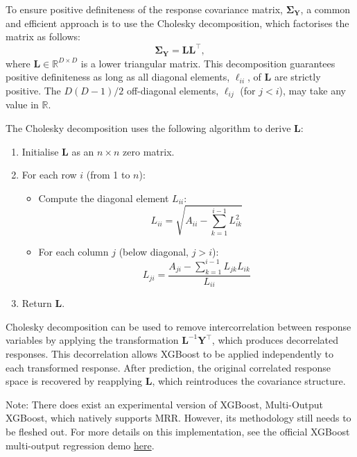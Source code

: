 \documentclass[11pt]{report} %
\begin{document}
To ensure positive definiteness of the response covariance matrix, \( \boldsymbol{\Sigma}_{\mathbf{Y}} \), a common and efficient approach is to use the Cholesky decomposition, which factorises the matrix as follows:
\[
\boldsymbol{\Sigma}_{\mathbf{Y}} = \mathbf{L} \mathbf{L}^\top,
\]
where \( \mathbf{L} \in \mathbb{R}^{D \times D} \) is a lower triangular matrix.\cite{marz2022multi} This decomposition guarantees positive definiteness as long as all diagonal elements, \( \ell_{ii} \), of \( \mathbf{L} \) are strictly positive. The \( D(D-1)/2 \) off-diagonal elements, \( \ell_{ij} \) (for \( j < i \)), may take any value in \( \mathbb{R} \). 

The Cholesky decomposition uses the following algorithm to derive $\mathbf{L}$:

\begin{enumerate}
    \item Initialise \( \mathbf{L} \) as an \( n \times n \) zero matrix.
    
    \item For each row \( i \) (from 1 to \( n \)):  
    \begin{itemize}
        \item Compute the diagonal element \( L_{ii} \):
        \[
        L_{ii} = \sqrt{A_{ii} - \sum_{k=1}^{i-1} L_{ik}^2}
        \]
        \item For each column \( j \) (below diagonal, \( j > i \)):
        \[
        L_{ji} = \frac{A_{ji} - \sum_{k=1}^{i-1} L_{jk} L_{ik}}{L_{ii}}
        \]
    \end{itemize}
    
    \item Return \( \mathbf{L} \).
\end{enumerate}
Cholesky decomposition can be used to remove intercorrelation between response variables by applying the transformation \( \mathbf{L}^{-1} \mathbf{Y}^\top \), which produces decorrelated responses.\cite{pollockcholesky} This decorrelation allows XGBoost to be applied independently to each transformed response. After prediction, the original correlated response space is recovered by reapplying \( \mathbf{L} \), which reintroduces the covariance structure.

\vspace{0.1cm}
\noindent Note: There does exist an experimental version of XGBoost, Multi-Output XGBoost, which natively supports MRR. However, its methodology still needs to be fleshed out. For more details on this implementation, see the official XGBoost multi-output regression demo \href{https://xgboost.readthedocs.io/en/stable/python/examples/multioutput_regression.html}{here}.
\end{document}
